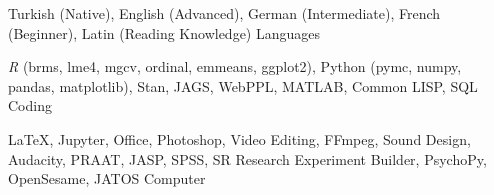 


\begin{cvhonors}

  \cvhonor
    {Turkish (Native), English (Advanced), German (Intermediate), French (Beginner), Latin (Reading Knowledge) } %
    {} %
    {} %
    {Languages} %

  \cvhonor
    {\textit{R} (brms, lme4, mgcv, ordinal, emmeans, ggplot2), Python (pymc, numpy, pandas, matplotlib), Stan, JAGS, WebPPL, MATLAB, Common LISP, SQL} %
    {}
    {} %
    {Coding} %

  \cvhonor
    {\LaTeX, Jupyter, Office, Photoshop, Video Editing, FFmpeg, Sound Design, Audacity, PRAAT, JASP, SPSS, SR Research Experiment Builder, PsychoPy, OpenSesame, JATOS} %
    {} %
    {} %
    {Computer} %



\end{cvhonors}
